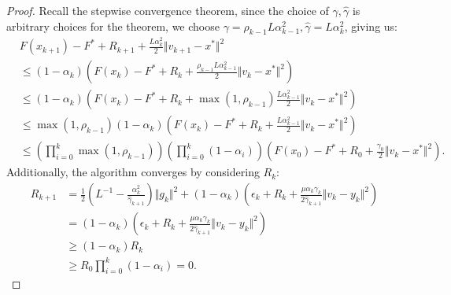 \documentclass[12pt]{article}
\begin{document}
    \begin{proof}  
        Recall the stepwise convergence theorem, since the choice of $\gamma, \hat \gamma$ is arbitrary choices for the theorem, we choose $\gamma = \rho_{k - 1} L \alpha_{k - 1}^2, \hat \gamma = L \alpha_k^2$, giving us: 
        {\small
        \begin{align*}
            &F(x_{k + 1}) - F^* + R_{k + 1} + \frac{L \alpha_k^2}{2}\Vert v_{k + 1} - x^*\Vert^2
            \\
            &\le 
            (1 - \alpha_k)
            \left(
                F(x_k) - F^* + R_k + \frac{\rho_{k - 1}L \alpha_{k - 1}^2}{2}\Vert v_k - x^*\Vert^2
            \right)
            \\
            &\le 
            (1 - \alpha_k)
            \left(
                F(x_k) - F^* + R_k + \max(1, \rho_{k - 1})\frac{L \alpha_{k - 1}^2}{2}\Vert v_k - x^*\Vert^2
            \right)
            \\
            &\le 
            \max(1, \rho_{k - 1})(1 - \alpha_k)
            \left(
                F(x_k) - F^* + R_k + \frac{L \alpha_{k - 1}^2}{2}\Vert v_k - x^*\Vert^2
            \right)
            \\
            &\le 
            \left(
                \prod_{i = 0}^{k} \max(1, \rho_{k - 1})
            \right)
            \left(
                \prod_{i = 0}^{k} \left(1  - \alpha_i\right)
            \right)
            \left(
                F(x_0) - F^* + R_0 + \frac{\gamma_0}{2}\Vert v_k - x^*\Vert^2
            \right). 
        \end{align*}
        }
        Additionally, the algorithm converges by considering $R_k$: 
        \begin{align*}
            R_{k + 1}
            &= 
            \frac{1}{2}\left(
                L^{-1} - \frac{\alpha_k^2}{\hat \gamma_{k + 1}}
            \right)\Vert g_k\Vert^2
            + 
            (1 - \alpha_k)
            \left(
                \epsilon_k + R_k + 
                \frac{\mu\alpha_k\gamma_k}{2\hat \gamma_{k + 1}}
                \Vert v_k - y_k\Vert^2
            \right)
            \\
            &= (1 - \alpha_k)
            \left(
                \epsilon_k + R_k 
                + \frac{\mu\alpha_k\gamma_k}{2\hat \gamma_{k + 1}}
                \Vert v_k - y_k\Vert^2
            \right)
            \\
            &\ge 
            (1 - \alpha_k) R_k
            \\
            &\ge R_0 \prod_{i = 0}^{k} \left(1 - \alpha_i\right) = 0. 

\end{align*}
\end{proof}
\end{document}
